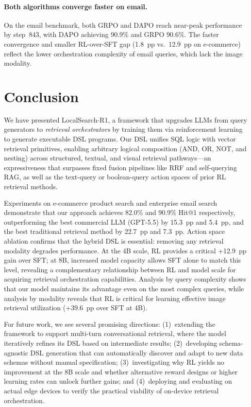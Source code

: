 \paragraph{Both algorithms converge faster on email.}
On the email benchmark, both GRPO and DAPO reach near-peak performance by step~843, with DAPO achieving 90.9\% and GRPO 90.6\%. The faster convergence and smaller RL-over-SFT gap (1.8~pp vs.\ 12.9~pp on e-commerce) reflect the lower orchestration complexity of email queries, which lack the image modality.


\section{Conclusion}
\label{sec:conclusion}

We have presented LocalSearch-R1, a framework that upgrades LLMs from query generators to \emph{retrieval orchestrators} by training them via reinforcement learning to generate executable DSL programs. Our DSL unifies SQL logic with vector retrieval primitives, enabling arbitrary logical composition (AND, OR, NOT, and nesting) across structured, textual, and visual retrieval pathways---an expressiveness that surpasses fixed fusion pipelines like RRF and self-querying RAG, as well as the text-query or boolean-query action spaces of prior RL retrieval methods.

Experiments on e-commerce product search and enterprise email search demonstrate that our approach achieves 82.0\% and 90.9\% Hit@1 respectively, outperforming the best commercial LLM (GPT-5.5) by 15.3~pp and 5.4~pp, and the best traditional retrieval method by 22.7~pp and 7.3~pp. Action space ablation confirms that the hybrid DSL is essential: removing any retrieval modality degrades performance. At the 4B scale, RL provides a critical +12.9~pp gain over SFT; at 8B, increased model capacity allows SFT alone to match this level, revealing a complementary relationship between RL and model scale for acquiring retrieval orchestration capabilities. Analysis by query complexity shows that our model maintains its advantage even on the most complex queries, while analysis by modality reveals that RL is critical for learning effective image retrieval utilization (+39.6~pp over SFT at 4B).

For future work, we see several promising directions: (1)~extending the framework to support multi-turn conversational retrieval, where the model iteratively refines its DSL based on intermediate results; (2)~developing schema-agnostic DSL generation that can automatically discover and adapt to new data schemas without manual specification; (3)~investigating why RL yields no improvement at the 8B scale and whether alternative reward designs or higher learning rates can unlock further gains; and (4)~deploying and evaluating on actual edge devices to verify the practical viability of on-device retrieval orchestration.


